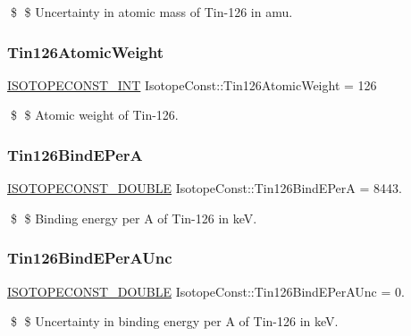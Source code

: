 \$ \$ Uncertainty in atomic mass of Tin-\/126 in amu. \mbox{\label{group___isotope_const-_tin-_sn126_gaf963ed9c2b83015793d279d41956c294}} 
\subsubsection{\texorpdfstring{Tin126\+Atomic\+Weight}{Tin126AtomicWeight}}
{\footnotesize\ttfamily \mbox{\hyperlink{group___isotope_const-_macros_ga5f18360b3e99483a35c32d789e62621c}{I\+S\+O\+T\+O\+P\+E\+C\+O\+N\+S\+T\+\_\+\+I\+NT}} Isotope\+Const\+::\+Tin126\+Atomic\+Weight = 126}

\$ \$ Atomic weight of Tin-\/126. \mbox{\label{group___isotope_const-_tin-_sn126_gad923fee2908bbb50fe8a5d2734704413}} 
\subsubsection{\texorpdfstring{Tin126\+Bind\+E\+PerA}{Tin126BindEPerA}}
{\footnotesize\ttfamily \mbox{\hyperlink{group___isotope_const-_macros_ga8f45a7272ce02c0b4c65c44636ed719a}{I\+S\+O\+T\+O\+P\+E\+C\+O\+N\+S\+T\+\_\+\+D\+O\+U\+B\+LE}} Isotope\+Const\+::\+Tin126\+Bind\+E\+PerA = 8443.}

\$ \$ Binding energy per A of Tin-\/126 in keV. \mbox{\label{group___isotope_const-_tin-_sn126_ga097428c183c1f2d952c60d121d52cdde}} 
\subsubsection{\texorpdfstring{Tin126\+Bind\+E\+Per\+A\+Unc}{Tin126BindEPerAUnc}}
{\footnotesize\ttfamily \mbox{\hyperlink{group___isotope_const-_macros_ga8f45a7272ce02c0b4c65c44636ed719a}{I\+S\+O\+T\+O\+P\+E\+C\+O\+N\+S\+T\+\_\+\+D\+O\+U\+B\+LE}} Isotope\+Const\+::\+Tin126\+Bind\+E\+Per\+A\+Unc = 0.}

\$ \$ Uncertainty in binding energy per A of Tin-\/126 in keV. \mbox{\label{group___isotope_const-_tin-_sn126_gac288197b8d2527b9cbbf857d6567d321}} 

